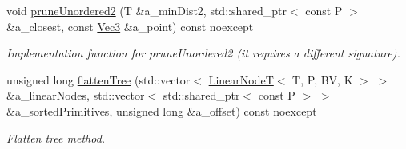 \begin{DoxyCompactItemize}
void \hyperlink{classBVH_1_1NodeT_a1079cba9ac1f114ad2cbc6cdea2eae49}{prune\+Unordered2} (T \&a\+\_\+min\+Dist2, std\+::shared\+\_\+ptr$<$ const P $>$ \&a\+\_\+closest, const \hyperlink{classBVH_1_1NodeT_a6fbb4308c5c55ee170c5f992df7ae1d0}{Vec3} \&a\+\_\+point) const noexcept
\begin{DoxyCompactList}\small\item\em Implementation function for prune\+Unordered2 (it requires a different signature). \end{DoxyCompactList}\item 
unsigned long \hyperlink{classBVH_1_1NodeT_a14f014426b00ad7989af328fa369bca8}{flatten\+Tree} (std\+::vector$<$ \hyperlink{classBVH_1_1LinearNodeT}{Linear\+NodeT}$<$ T, P, BV, K $>$ $>$ \&a\+\_\+linear\+Nodes, std\+::vector$<$ std\+::shared\+\_\+ptr$<$ const P $>$ $>$ \&a\+\_\+sorted\+Primitives, unsigned long \&a\+\_\+offset) const noexcept
\begin{DoxyCompactList}\small\item\em Flatten tree method. \end{DoxyCompactList}\end{DoxyCompactItemize}
